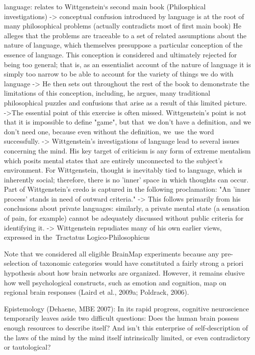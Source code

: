 \documentclass[authoryear,review,3p]{elsarticle}
\begin{document}
language: relates to Wittgenstein‘s second main book (Philosphical investigations)
-> conceptual confusion introduced by language is at the root of many philosophical problems (actually contradicts most of first main book)
He alleges that the problems are traceable to a set of related assumptions about the nature of language, which themselves presuppose a particular conception of the essence of language. This conception is considered and ultimately rejected for being too general; that is, as an essentialist account of the nature of language it is simply too narrow to be able to account for the variety of things we do with language
-> He then sets out throughout the rest of the book to demonstrate the limitations of this conception, including, he argues, many traditional philosophical puzzles and confusions that arise as a result of this limited picture.
->The essential point of this exercise is often missed. Wittgenstein's point is not that it is impossible to define "game", but that we don't have a definition, and we don't need one, because even without the definition, we use the word successfully.
-> Wittgenstein's investigations of language lead to several issues concerning the mind. His key target of criticism is any form of extreme mentalism which posits mental states that are entirely unconnected to the subject's environment. For Wittgenstein, thought is inevitably tied to language, which is inherently social; therefore, there is no 'inner' space in which thoughts can occur. Part of Wittgenstein's credo is captured in the following proclamation: "An 'inner process' stands in need of outward criteria."
-> This follows primarily from his conclusions about private languages: similarly, a private mental state (a sensation of pain, for example) cannot be adequately discussed without public criteria for identifying it.
-> Wittgenstein repudiates many of his own earlier views, expressed in the Tractatus Logico-Philosophicus

Note that we considered all eligible BrainMap experiments because any pre-selection of taxonomic categories would have constituted a fairly strong a priori hypothesis about how brain networks are organized. However, it remains elusive how well psychological constructs, such as emotion and cognition, map on regional brain responses (Laird et al., 2009a; Poldrack, 2006).


Epistemology (Dehaene, MBE 2007):
In its rapid progress, cognitive neuroscience temporarily leaves aside two difficult questions: Does the human brain possess enough resources to describe itself? And isn’t this enterprise of self-description of the laws of the mind by the mind itself intrinsically limited, or even contradictory or tautological?
\end{document}
